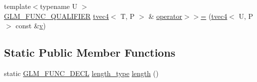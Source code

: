 \begin{DoxyCompactItemize}
\item 
{\footnotesize template$<$typename U $>$ }\\\mbox{\hyperlink{setup_8hpp_a33fdea6f91c5f834105f7415e2a64407}{G\+L\+M\+\_\+\+F\+U\+N\+C\+\_\+\+Q\+U\+A\+L\+I\+F\+I\+ER}} \mbox{\hyperlink{structglm_1_1tvec4}{tvec4}}$<$ T, P $>$ \& \mbox{\hyperlink{structglm_1_1tvec4_aafc6289fa58e4d84390259bf8287cb72}{operator$>$$>$=}} (\mbox{\hyperlink{structglm_1_1tvec4}{tvec4}}$<$ U, P $>$ const \&\mbox{\hyperlink{glad_8h_a14cfbe2fc2234f5504618905b69d1e06}{v}})
\end{DoxyCompactItemize}
\subsection*{Static Public Member Functions}
\begin{DoxyCompactItemize}
\item 
static \mbox{\hyperlink{setup_8hpp_ab2d052de21a70539923e9bcbf6e83a51}{G\+L\+M\+\_\+\+F\+U\+N\+C\+\_\+\+D\+E\+CL}} \mbox{\hyperlink{structglm_1_1tvec4_a4e2b34a427cac7e72b6f73173c206feb}{length\+\_\+type}} \mbox{\hyperlink{structglm_1_1tvec4_af5cc061d6e7bb66de7d0f3647728c9ff}{length}} ()
\end{DoxyCompactItemize}
